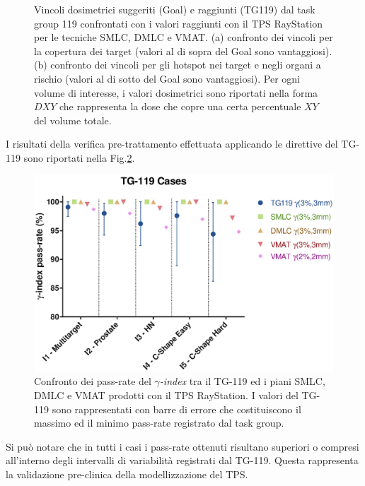 \begin{figure}
\caption{Vincoli dosimetrici suggeriti (Goal) e raggiunti (TG119) dal task group 119 confrontati con i valori raggiunti con il TPS RayStation per le tecniche SMLC, DMLC e VMAT. (a) confronto dei vincoli per la copertura dei target (valori al di sopra del Goal sono vantaggiosi). (b) confronto dei vincoli per gli hotspot nei target e negli organi a rischio (valori al di sotto del Goal sono vantaggiosi). Per ogni volume di interesse, i valori dosimetrici sono riportati nella forma $DXY$ che rappresenta la dose che copre una certa percentuale $XY$ del volume totale.}
\label{fig:TG119_stats}
\end{figure}

I risultati della verifica pre-trattamento effettuata applicando le direttive del TG-119 sono riportati nella Fig.\ref{fig:TG_119_gamma}.
\begin{figure}
\centering
\includegraphics[width=\textwidth]{./cap2/TG119_Plots/TG_119_gamma.eps}
\caption{Confronto dei pass-rate del $\gamma$\textit{-index} tra il TG-119 ed i piani SMLC, DMLC e VMAT prodotti con il TPS RayStation. I valori del TG-119 sono rappresentati con barre di errore che costituiscono il massimo ed il minimo pass-rate registrato dal task group.}
\label{fig:TG_119_gamma}
\end{figure}
Si può notare che in tutti i casi i pass-rate ottenuti risultano superiori o compresi all'interno degli intervalli di variabilità registrati dal TG-119. Questa rappresenta la validazione pre-clinica della modellizzazione del TPS.


